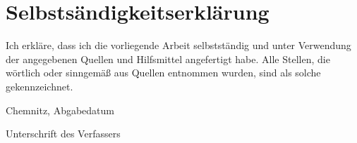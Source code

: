 \section{Selbstsändigkeitserklärung}

Ich erkläre, dass ich die vorliegende Arbeit selbstständig und unter Verwendung der angegebenen
Quellen und Hilfsmittel angefertigt habe. Alle Stellen, die wörtlich oder sinngemäß aus Quellen
entnommen wurden, sind als solche gekennzeichnet.

Chemnitz, Abgabedatum

Unterschrift des Verfassers